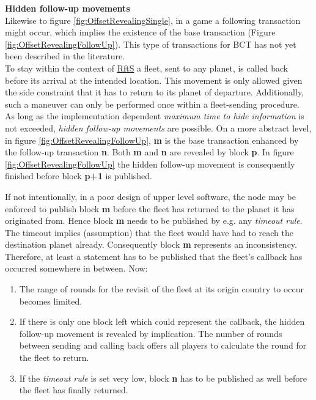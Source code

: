 \noindent \textbf{Hidden follow-up movements} \\
Likewise to figure \ref{fig:OffsetRevealingSingle}, in a game a following transaction might occur, which implies the existence of the base transaction (Figure \ref{fig:OffsetRevealingFollowUp}). \label{lbl:FollowUpMoves}
This type of transactions for \gls{BCT} has not yet been described in the literature. \\
To stay within the context of \hyperref[def:RftS]{RftS} a fleet, sent to any planet, is called back before its arrival at the intended location.
This movement is only allowed given the side constraint that it has to return to its planet of departure.
Additionally, such a maneuver can only be performed once within a fleet-sending procedure. \\
As long as the implementation dependent \textit{maximum time to hide information} is not exceeded, \textit{hidden follow-up movements} are possible.
On a more abstract level, in figure \ref{fig:OffsetRevealingFollowUp},
\textbf{m} is the base transaction enhanced by the follow-up transaction \textbf{n}.
Both \textbf{m} and \textbf{n} are revealed by block \textbf{p}.
In figure \ref{fig:OffsetRevealingFollowUp} the hidden follow-up movement is consequently finished before block \textbf{p+1} is published.
\begin{figure}
\end{figure}
\noindent If not intentionally, in a poor design of upper level software, the node may be enforced to publish block \textbf{m}
before the fleet has returned to the planet it has originated from.
Hence block \textbf{m} needs to be published by e.g. any \textit{timeout rule}.
The timeout implies (assumption) that the fleet would have had to reach the destination planet already.
Consequently block \textbf{m} represents an inconsistency.
Therefore, at least a statement has to be published that the
fleet's callback has occurred somewhere in between.
Now: 
\begin{enumerate}
	\item The range of rounds for the revisit of the fleet at its origin country to occur becomes limited.
	\item If there is only one block left which could represent the callback, the hidden follow-up movement is revealed by implication.
	The number of rounds between sending and calling back offers all players to calculate the round for the fleet to return.
	\item If the \textit{timeout rule} is set very low, block \textbf{n} has to be published as well before the fleet has finally returned.
\end{enumerate}
